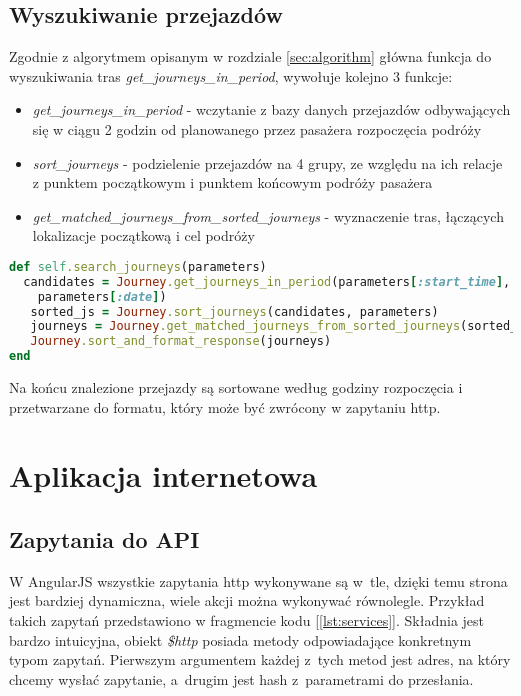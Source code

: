 \documentclass[eng,archivemode]{mgr}
\begin{document}
\subsection{Wyszukiwanie przejazdów}
Zgodnie z algorytmem opisanym w rozdziale \ref{sec:algorithm} główna funkcja do wyszukiwania tras \textit{get\_journeys\_in\_period}, wywołuje kolejno 3 funkcje:
\begin{itemize}
	\item \textit{get\_journeys\_in\_period} - wczytanie z bazy danych przejazdów odbywających się w ciągu 2 godzin od planowanego przez pasażera rozpoczęcia podróży
	\item \textit{sort\_journeys} - podzielenie przejazdów na 4 grupy, ze względu na ich relacje z punktem początkowym i punktem końcowym podróży pasażera
	\item \textit{get\_matched\_journeys\_from\_sorted\_journeys} - wyznaczenie tras, łączących lokalizacje początkową i cel podróży
\end{itemize}
\begin{lstlisting}[language=Ruby, caption={Wyszukanie przejazdów o~zadanych parametrach}, label=lst:search_journeys]
def self.search_journeys(parameters)
  candidates = Journey.get_journeys_in_period(parameters[:start_time],
    parameters[:date])
   sorted_js = Journey.sort_journeys(candidates, parameters)
   journeys = Journey.get_matched_journeys_from_sorted_journeys(sorted_js)
   Journey.sort_and_format_response(journeys)
end
\end{lstlisting}
Na końcu znalezione przejazdy są sortowane według godziny rozpoczęcia i przetwarzane do formatu, który może być zwrócony w zapytaniu http.
\newpage
\section{Aplikacja internetowa}
\subsection{Zapytania do API}
W AngularJS wszystkie zapytania http wykonywane są w~tle, dzięki temu strona jest bardziej dynamiczna, wiele akcji można wykonywać równolegle. Przykład takich zapytań przedstawiono w fragmencie kodu [\ref{lst:services}]. Składnia jest bardzo intuicyjna, obiekt \textit{\$http} posiada metody odpowiadające konkretnym typom zapytań. Pierwszym argumentem każdej z~tych metod jest adres, na który chcemy wysłać zapytanie, a~drugim jest hash z~parametrami do przesłania.
\end{document}
